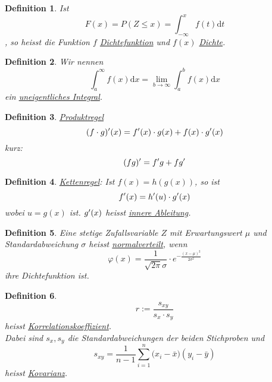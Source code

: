 \documentclass{article}
\newtheorem{mydef}{Definition}
\begin{document}
\begin{mydef}
Ist
\begin{equation}
F(x) = P(Z \leq x) = \int_{-\infty}^{x}{f(t)} \mathrm{d}t
\end{equation}
, so heisst die Funktion $f$ \underline{Dichtefunktion} und $f(x)$ \underline{Dichte}.
\end{mydef}
\begin{mydef}
Wir nennen
\begin{equation}
\int_{a}^{\infty} f(x) \mathrm{d}x = \lim_{b \to \infty} \int_{a}^{b} f(x) \mathrm{d}x
\end{equation}
ein \underline{uneigentliches Integral}.
\end{mydef}
\begin{mydef}
\underline{Produktregel}
\begin{equation}
(f \cdot g)\rq{}(x) = f\rq{}(x) \cdot g(x) + f(x) \cdot g\rq{}(x)
\end{equation}
kurz:
\begin{equation}
(fg)\rq{} = f\rq{}g + fg\rq{}
\end{equation}
\end{mydef}
\begin{mydef}\underline{Kettenregel}: 
Ist $f(x) = h(g(x))$, so ist
\begin{equation}
f\rq{}(x) = h\rq{}(u) \cdot g\rq{}(x)
\end{equation}
wobei $u = g(x)$ ist. $g\rq{}(x)$ heisst \underline{innere Ableitung}.
\end{mydef}
\begin{mydef}
Eine stetige Zufallsvariable $Z$ mit Erwartungswert $\mu$ und Standardabweichung $\sigma$ heisst \underline{normalverteilt}, wenn
\begin{equation}
\varphi(x) = \frac{1}{\sqrt{2 \pi} \sigma} \cdot e^{-\frac{(x-\mu)^2}{2 \sigma^2}}
\end{equation}
ihre Dichtefunktion ist.
\end{mydef}
\begin{mydef}
\begin{equation}
r := \frac{s_{xy}}{s_x \cdot s_y}
\end{equation}
heisst \underline{Korrelationskoeffizient}.\\
Dabei sind $s_x, s_y$ die Standardabweichungen der beiden Stichproben und
\begin{equation}
s_{xy} = \frac{1}{n-1} \sum_{i=1}^{n}{(x_i - \bar{x}})(y_i - \bar{y})
\end{equation}
heisst \underline{Kovarianz}.
\end{mydef}
\end{document}
